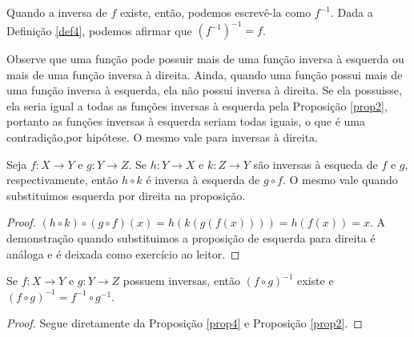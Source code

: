 Quando a inversa de $f$ existe, então, podemos escrevê-la como $f^{-1}$. Dada
a Definição \ref{def4}, podemos afirmar que $(f^{-1})^{-1} = f$.

Observe que uma função pode possuir mais de uma função inversa à esquerda ou
mais de uma função inversa à direita. Ainda, quando uma função possui mais de
uma função inversa à esquerda, ela não possui inversa à direita. Se ela
possuisse, ela seria igual a todas as funções inversas à esquerda pela
Proposição \ref{prop2}, portanto as funções inversas à esquerda seriam todas
iguais, o que é uma contradição,por hipótese. O mesmo vale para inversas à
direita.

\begin{theorem}
     \label{prop4}
     Seja $f: X \to Y $ e $g: Y \to Z$. Se $h: Y \to X$ e $k: Z \to Y$ são
     inversas à esqueda de $f$ e $g$, respectivamente, então $h \circ k$ é
     inversa à esquerda de $g \circ f$. O mesmo vale quando substituimos
     esquerda por direita na proposição.
\end{theorem}

\begin{proof}
 $(h \circ k)\circ(g \circ f)(x) = h(k(g(f(x)))) = h(f(x)) = x $. A
 demonstração quando substituimos a proposição de esquerda para direita é
 análoga e é deixada como exercício ao leitor.
\end{proof}

\begin{corollary}
    \label{cor1}
    Se $f: X \to Y$ e $g: Y \to Z$ possuem inversas, então $(f \circ g)^{-1}$
    existe e $(f \circ g)^{-1} = f^{-1} \circ g^{-1}$.
\end{corollary}

\begin{proof}
    Segue diretamente da Proposição \ref{prop4} e Proposição \ref{prop2}.
\end{proof}